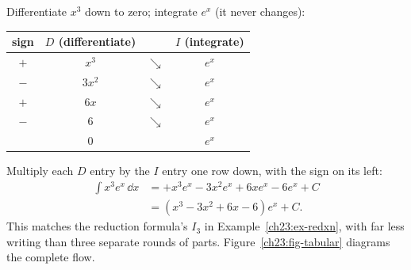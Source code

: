 \begin{example}
\label{ch23:ex-tabx3}
Differentiate $x^3$ down to zero; integrate $e^x$ (it never changes):
\begin{center}
\begin{tabular}{c c c c}
\toprule
sign & $D$ (differentiate) & & $I$ (integrate) \\
\midrule
$+$ & $x^3$ & $\searrow$ & $e^x$ \\
$-$ & $3x^2$ & $\searrow$ & $e^x$ \\
$+$ & $6x$ & $\searrow$ & $e^x$ \\
$-$ & $6$ & $\searrow$ & $e^x$ \\
& $0$ & & $e^x$ \\
\bottomrule
\end{tabular}
\end{center}
Multiply each $D$ entry by the $I$ entry one row down, with the sign on its left:
\begin{align*}
\int x^3 e^x\,\dd x
&= +x^3 e^x - 3x^2 e^x + 6x e^x - 6 e^x + C\\
&= (x^3 - 3x^2 + 6x - 6)e^x + C.
\end{align*}
This matches the reduction formula's $I_3$ in Example~\ref{ch23:ex-redxn}, with
far less writing than three separate rounds of parts. Figure~\ref{ch23:fig-tabular} diagrams the complete flow.
\end{example}

